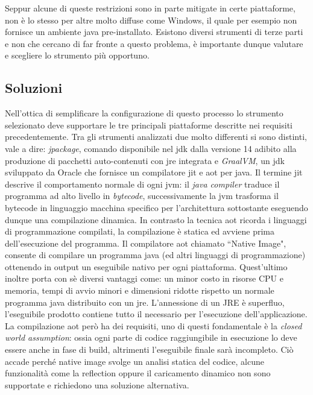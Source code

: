 Seppur alcune di queste restrizioni sono in parte mitigate in certe piattaforme, non è lo stesso per altre molto diffuse come Windows, il quale per esempio non fornisce un ambiente java pre-installato. Esistono diversi strumenti di terze parti e non che cercano di far fronte a questo problema, è importante dunque valutare e scegliere lo strumento più opportuno.

\subsection{Soluzioni}

Nell'ottica di semplificare la configurazione di questo processo lo strumento selezionato deve supportare le tre principali piattaforme descritte nei requisiti precedentemente. Tra gli strumenti analizzati due molto differenti si sono distinti, vale a dire: \textit{jpackage}, comando disponibile nel \ac{jdk} dalla versione 14 adibito alla produzione di pacchetti auto-contenuti con \ac{jre} integrata e \textit{GraalVM}, un \ac{jdk} sviluppato da Oracle che fornisce un compilatore \ac{jit} e \ac{aot} per java. Il termine \ac{jit} descrive il comportamento normale di ogni \ac{jvm}: il \textit{java compiler} traduce il programma ad alto livello in \textit{bytecode}, successivamente la \ac{jvm} trasforma il bytecode in linguaggio macchina specifico per l'architettura sottostante eseguendo dunque una compilazione dinamica. In contrasto la tecnica \ac{aot} ricorda i linguaggi di programmazione compilati, la compilazione è statica ed avviene prima dell'esecuzione del programma. Il compilatore \ac{aot} chiamato ``Native Image", consente di compilare un programma java (ed altri linguaggi di programmazione) ottenendo in output un eseguibile nativo per ogni piattaforma. Quest'ultimo inoltre porta con sè diversi vantaggi come: un minor costo in risorse CPU e memoria, tempi di avvio minori e dimensioni ridotte rispetto un normale programma java distribuito con un \ac{jre}. L'annessione di un JRE è superfluo, l'eseguibile prodotto contiene tutto il necessario per l'esecuzione dell'applicazione. La compilazione \ac{aot} però ha dei requisiti, uno di questi fondamentale è la \textit{closed world assumption}: ossia ogni parte di codice raggiungibile in esecuzione lo deve essere anche in fase di build, altrimenti l'eseguibile finale sarà incompleto. Ciò accade perché native image svolge un analisi statica del codice, alcune funzionalità come la reflection oppure il caricamento dinamico non sono supportate e richiedono una soluzione alternativa.

